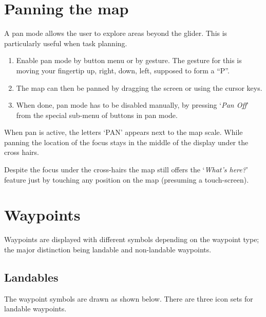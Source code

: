 \section{Panning the map}\label{sec:panning}

A pan mode allows the user to explore areas beyond the glider.  This
is particularly useful when task planning.
\begin{enumerate}
\item Enable pan mode by button menu or by gesture.  The gesture for this is moving your fingertip up, right, down, left, supposed to form a ``P''.
\item The map can then be panned by dragging the screen or using the cursor
  keys.
\item When done, pan mode has to be disabled manually, by pressing `\emph{Pan Off}' 
  from the special sub-menu of buttons in pan mode.
\end{enumerate} 

When pan is active, the letters `PAN' appears next to the map scale.  While
panning the location of the focus stays in the middle of the display under the
cross hairs. 

Despite the focus under the cross-hairs the map
still offers the `\emph{What's here?}' feature just by touching any 
position on the map (presuming a touch-screen).


\section{Waypoints}\label{sec:waypoint-schemes}
Waypoints are displayed with different symbols depending on the
waypoint type; the major distinction being landable and non-landable
waypoints.

\subsection*{Landables}
The waypoint symbols are drawn as shown below. There are three icon sets for
landable waypoints. 

